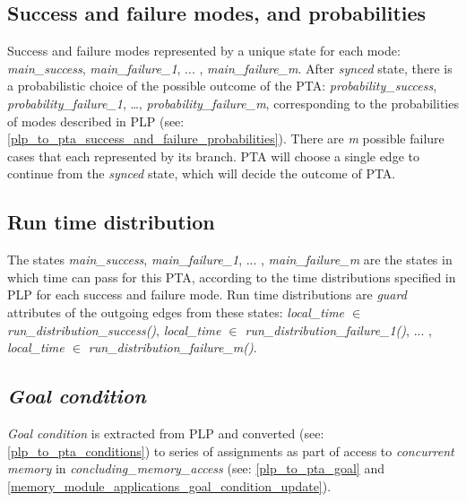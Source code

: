 \subsection{Success and failure modes, and probabilities \label{pta_achieve_success_failures_probabilities}}
Success and failure modes represented by a unique state for each mode: \textcolor{ColorUppaalState}{\textit{main_success}}, \textcolor{ColorUppaalState}{\textit{main_failure_1}}, ... , \textcolor{ColorUppaalState}{\textit{main_failure_m}}. After \textcolor{ColorUppaalState}{\textit{synced}} state, there is a probabilistic choice of the possible outcome of the PTA: \textcolor{ColorEdgeProbability}{\textit{probability_success}}, \textcolor{ColorEdgeProbability}{\textit{probability_failure_1}}, …, \textcolor{ColorEdgeProbability}{\textit{probability_failure_m}}, corresponding to the probabilities of modes described in PLP (see: \ref{plp_to_pta_success_and_failure_probabilities}). There are \textit{m} possible failure cases that each represented by its branch. PTA will choose a single edge to continue from the \textcolor{ColorUppaalState}{\textit{synced}} state, which will decide the outcome of PTA.\\
\subsection{Run time distribution \label{pta_achieve_run_time_distribution}}
The states \textcolor{ColorUppaalState}{\textit{main_success}}, \textcolor{ColorUppaalState}{\textit{main_failure_1}}, ... , \textcolor{ColorUppaalState}{\textit{main_failure_m}} are the states in which time can pass for this PTA, according to the time distributions specified in PLP for each success and failure mode. Run time distributions are \textit{guard} attributes of the outgoing edges from these states: \textcolor{ColorEdgeGuard}{\textit{local_time $\in$ run_distribution_success()}}, \textcolor{ColorEdgeGuard}{\textit{local_time $\in$ run_distribution_failure_1()}}, ... , \textcolor{ColorEdgeGuard}{\textit{local_time $\in$ run_distribution_failure_m()}}.\\
\subsection{\textit{\textit{Goal condition}}}
\textit{\textit{Goal condition}} is extracted from PLP and converted (see: \ref{plp_to_pta_conditions}) to series of assignments as part of access to \textit{concurrent memory} in \textcolor{ColorUppaalState}{\textit{concluding_memory_access}} (see: \ref{plp_to_pta_goal} and \ref{memory_module_applications_goal_condition_update}). \\

